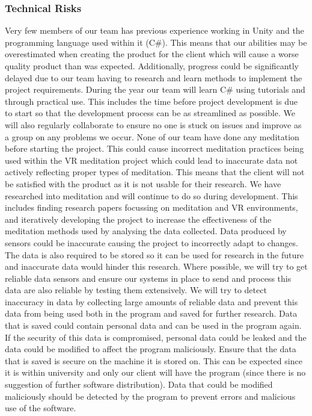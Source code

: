 \documentclass[coverpage,lineno]{../custom}
\begin{document}
\subsubsection{Technical Risks}
{Very few members of our team has previous experience working in Unity and the programming language used within it (C\#). This means that our abilities may be overestimated when creating the product for the client which will cause a worse quality product than was expected. Additionally, progress could be significantly delayed due to our team having to research and learn methods to implement the project requirements.}
{During the year our team will learn C\# using tutorials and through practical use. This includes the time before project development is due to start so that the development process can be as streamlined as possible. We will also regularly collaborate to ensure no one is stuck on issues and improve as a group on any problems we occur.}
{None of our team have done any meditation before starting the project. This could cause incorrect meditation practices being used within the VR meditation project which could lead to inaccurate data not actively reflecting proper types of meditation. This means that the client will not be satisfied with the product as it is not usable for their research.}
{We have researched into meditation and will continue to do so during development. This includes finding research papers focussing on meditation and VR environments, and iteratively developing the project to increase the effectiveness of the meditation methods used by analysing the data collected.}
{Data produced by sensors could be inaccurate causing the project to incorrectly adapt to changes. The data is also required to be stored so it can be used for research in the future and inaccurate data would hinder this research.}
{Where possible, we will try to get reliable data sensors and ensure our systems in place to send and process this data are also reliable by testing them extensively. We will try to detect inaccuracy in data by collecting large amounts of reliable data and prevent this data from being used both in the program and saved for further research.}
{Data that is saved could contain personal data and can be used in the program again. If the security of this data is compromised, personal data could be leaked and the data could be modified to affect the program maliciously.}
{Ensure that the data that is saved is secure on the machine it is stored on. This can be expected since it is within university and only our client will have the program (since there is no suggestion of further software distribution). Data that could be modified maliciously should be detected by the program to prevent errors and malicious use of the software.}
\end{document}
